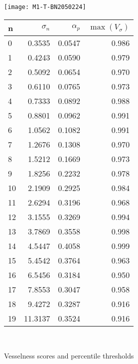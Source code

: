 
\begin{figure}
	\begin{minipage}[tp]{0.5\textwidth}
		\texttt{[image: M1-T-BN2050224]}
	\end{minipage}
	\quad
	\begin{minipage}[tp]{0.35\textwidth}
		\begin{tabular}{l|r|r|r}
			n  & $\sigma_n$  &  $\alpha_p$  &  $\max(V_\sigma)$ \\
			\hline
			0  &   0.3535 &  0.0547 &  0.986\\
			1  &   0.4243 &  0.0590 &  0.979\\
			2  &   0.5092 &  0.0654 &  0.970\\
			3  &   0.6110 &  0.0765 &  0.973\\
			4  &   0.7333 &  0.0892 &  0.988\\
			5  &   0.8801 &  0.0962 &  0.991\\
			6  &   1.0562 &  0.1082 &  0.991\\
			7  &   1.2676 &  0.1308 &  0.970\\
			8  &   1.5212 &  0.1669 &  0.973\\
			9  &   1.8256 &  0.2232 &  0.978\\
			10 &   2.1909 &  0.2925 &  0.984\\
			11 &   2.6294 &  0.3196 &  0.968\\
			12 &   3.1555 &  0.3269 &  0.994\\
			13 &   3.7869 &  0.3558 &  0.998\\
			14 &   4.5447 &  0.4058 &  0.999\\
			15 &   5.4542 &  0.3764 &  0.963\\
			16 &   6.5456 &  0.3184 &  0.950\\
			17 &   7.8553 &  0.3047 &  0.958\\
			18 &   9.4272 &  0.3287 &  0.916\\
			19 &  11.3137 &  0.3524 &  0.916\\
		\end{tabular} \\
	\end{minipage}
	\caption{Vesselness scores and percentile thresholds}
\end{figure}

